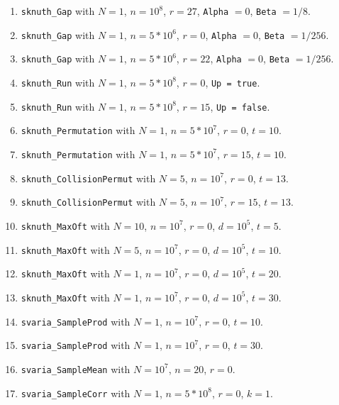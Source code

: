 \begin{enumerate}
  \item {\tt sknuth\_Gap} with $N=1$, $n=10^8$, $r=27$, {\tt Alpha} $=0$,
    {\tt Beta} $=1/8$.

  \item {\tt sknuth\_Gap} with $N=1$, $n=5*10^6$, $r=0$, {\tt Alpha} $=0$,
   {\tt Beta} $=1/256$.

  \item {\tt sknuth\_Gap} with $N=1$, $n=5*10^6$, $r=22$, {\tt Alpha} $=0$,
    {\tt Beta} $=1/256$.

  \item {\tt sknuth\_Run}  with $N=1$, $n=5*10^8$, $r=0$, {\tt Up = true}.

  \item {\tt sknuth\_Run}  with $N=1$, $n=5*10^8$, $r=15$, {\tt Up = false}.

  \item {\tt sknuth\_Permutation} with $N=1$, $n=5*10^7$, $r=0$, $t=10$.

  \item {\tt sknuth\_Permutation} with $N=1$, $n=5*10^7$, $r=15$, $t=10$.

  \item {\tt sknuth\_CollisionPermut} with $N=5$, $n=10^7$, $r=0$, $t=13$.

  \item {\tt sknuth\_CollisionPermut} with $N=5$, $n=10^7$, $r=15$, $t=13$.

  \item {\tt sknuth\_MaxOft} with $N=10$, $n=10^7$, $r=0$, $d=10^5$, $t=5$.

  \item {\tt sknuth\_MaxOft} with $N=5$, $n=10^7$, $r=0$, $d=10^5$, $t=10$.

  \item {\tt sknuth\_MaxOft} with $N=1$, $n=10^7$, $r=0$, $d=10^5$, $t=20$.

  \item {\tt sknuth\_MaxOft} with $N=1$, $n=10^7$, $r=0$, $d=10^5$, $t=30$.

  \item {\tt svaria\_SampleProd} with $N=1$, $n=10^7$, $r=0$, $t=10$.

  \item {\tt svaria\_SampleProd} with $N=1$, $n=10^7$, $r=0$, $t=30$.

  \item {\tt svaria\_SampleMean} with $N=10^7$, $n=20$, $r=0$.

  \item {\tt svaria\_SampleCorr} with $N=1$, $n=5*10^8$, $r=0$, $k=1$.


\end{enumerate}
